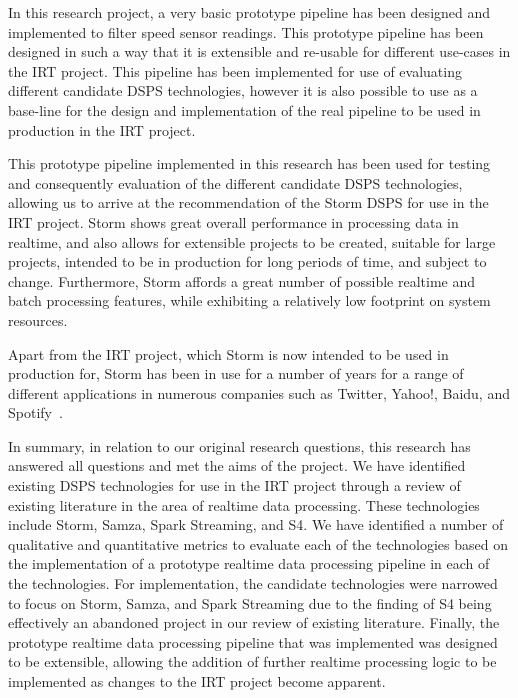 In this research project, a very basic prototype pipeline has been designed and implemented to filter speed sensor readings.
This prototype pipeline has been designed in such a way that it is extensible and re-usable for different use-cases in the
IRT project. This pipeline has been implemented for use of evaluating different candidate DSPS technologies, however it is
also possible to use as a base-line for the design and implementation of the real pipeline to be used in production in the
IRT project.

This prototype pipeline implemented in this research has been used for testing and consequently evaluation of the different
candidate DSPS technologies, allowing us to arrive at the recommendation of the Storm DSPS for use in the IRT project.
Storm shows great overall performance in processing data in realtime, and also allows for extensible projects to be created,
suitable for large projects, intended to be in production for long periods of time, and subject to change. Furthermore,
Storm affords a great number of possible realtime and batch processing features, while exhibiting a relatively low
footprint on system resources.

Apart from the IRT project, which Storm is now intended to be used in production for, Storm has been in use for a number of years
for a range of different applications in numerous companies such as Twitter, Yahoo!, Baidu, and Spotify~\cite{storm_users}.

In summary, in relation to our original research questions, this research has answered all questions and met the aims of
the project. We have identified existing DSPS technologies for use in the IRT project through a review of existing literature
in the area of realtime data processing. These technologies include Storm, Samza, Spark Streaming, and S4. We have identified
a number of qualitative and quantitative metrics to evaluate each of the technologies based on the implementation of a
prototype realtime data processing pipeline in each of the technologies. For implementation, the candidate technologies
were narrowed to focus on Storm, Samza, and Spark Streaming due to the finding of S4 being effectively an abandoned project
in our review of existing literature. Finally, the prototype realtime data processing pipeline that was implemented was
designed to be extensible, allowing the addition of further realtime processing logic to be implemented as changes to the
IRT project become apparent.



